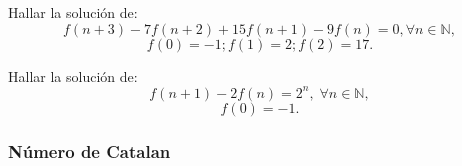 \begin{frame}
	\begin{example}
		Hallar la solución de:
		$$f(n+3)-7f(n+2)+15f(n+1)-9f(n) = 0, \forall n \in \mathbb{N},$$
		$$f(0) = -1; f(1) = 2; f(2) = 17.$$
	\end{example}
	\begin{example}[E.D.L.C]
		Hallar la solución de:
		$$f(n + 1) - 2f(n) = 2^{n} , \; \forall n \in \mathbb{N},$$
		$$f(0) = -1.$$
	\end{example}
\end{frame}
%	


\subsubsection{Número de Catalan}

